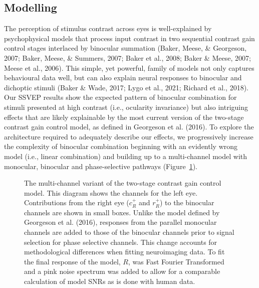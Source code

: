 \documentclass[
  12pt,
]{article}
\begin{document}
\subsection{Modelling}\label{modelling}

The perception of stimulus contrast across eyes is well-explained by
psychophysical models that process input contrast in two sequential
contrast gain control stages interlaced by binocular summation (Baker,
Meese, \& Georgeson, 2007; Baker, Meese, \& Summers, 2007; Baker et al.,
2008; Baker \& Meese, 2007; Meese et al., 2006). This simple, yet
powerful, family of models not only captures behavioural data well, but
can also explain neural responses to binocular and dichoptic stimuli
(Baker \& Wade, 2017; Lygo et al., 2021; Richard et al., 2018). Our
SSVEP results show the expected pattern of binocular combination for
stimuli presented at high contrast (i.e., ocularity invariance) but also
intriguing effects that are likely explainable by the most current
version of the two-stage contrast gain control model, as defined in
Georgeson et al. (2016). To explore the architecture required to
adequately describe our effects, we progressively increase the
complexity of binocular combination beginning with an evidently wrong
model (i.e., linear combination) and building up to a multi-channel
model with monocular, binocular and phase-selective pathways
(Figure~\ref{fig-modelDiagram}).

\begin{figure}


\caption{\label{fig-modelDiagram}The multi-channel variant of the
two-stage contrast gain control model. This diagram shows the channels
for the left eye. Contributions from the right eye (\(c^+_R\) and
\(r^+_R\)) to the binocular channels are shown in small boxes. Unlike
the model defined by Georgeson et al. (2016), responses from the
parallel monocular channels are added to those of the binocular channels
prior to signal selection for phase selective channels. This change
accounts for methodological differences when fitting neuroimaging data.
To fit the final response of the model, \(R\), was Fast Fourier
Transformed and a pink noise spectrum was added to allow for a
comparable calculation of model SNRs as is done with human data.}

\end{figure}%
\end{document}

